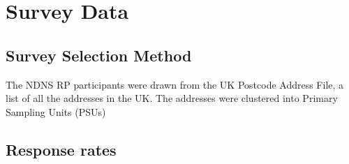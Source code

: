 
\section{Survey Data}

\subsection{Survey Selection Method}

The NDNS RP participants were drawn from the UK Postcode Address File, a list of all the addresses in the UK. The addresses were clustered into Primary Sampling Units (PSUs)

\subsection{Response rates}
